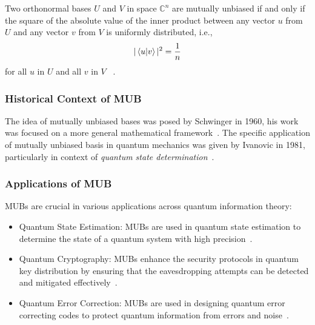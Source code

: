 \begin{definition}
Two orthonormal bases $U$ and $V$ in space $\mathbb{C}^n$ are mutually unbiased if and only if the square of the absolute value of the inner product between any vector $u$ from $U$ and any vector $v$ from $V$ is uniformly distributed, i.e.,
$$|\braket{u|v}|^2 = \frac{1}{n}$$ for all $u$ in $U$ and all $v$ in $V$ \emph{~\cite{wootters1986quantummechanicsprobability}}.
\end{definition}

\subsubsection{Historical Context of MUB}

The idea of mutually unbiased bases was posed by Schwinger in 1960, his work was focused on a more general mathematical framework~\cite{schwinger1960UnitaryOperatorBases}. 
The specific application of mutually unbiased basis in quantum mechanics was given by Ivanovic in 1981, particularly in context of \textit{quantum state determination}~\cite{ivanovic1981geometricaldescriptionquantal}. 

\subsubsection{Applications of MUB}

MUBs are crucial in various applications across quantum information theory:
\begin{itemize}
  \item Quantum State Estimation: MUBs are used in quantum state estimation to determine the state of a quantum system with high precision~\cite{adamson2008ExperimentalQuantumState, grassl2005TomographyQuantumStates}.
  \item Quantum Cryptography: MUBs enhance the security protocols in quantum key distribution by ensuring that the eavesdropping attempts can be detected and mitigated effectively~\cite{cerf2002SecurityQuantumKey}.
  \item Quantum Error Correction: MUBs are used in designing quantum error correcting codes to protect quantum information from errors and noise~\cite{klappenecker2004ConstructionsMutuallyUnbiased}.
\end{itemize}

